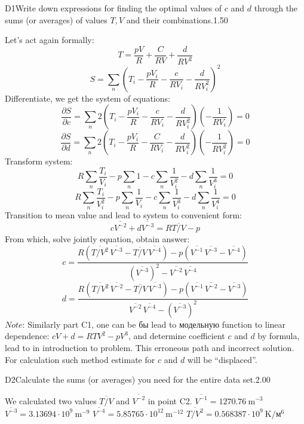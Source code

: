 \documentclass[11pt,a4paper]{article}
\begin{document}
\begin{solcard}{D1}{Write down expressions for finding the optimal values of $c$ and $d$ through the sums (or averages) of values $T, V$ and their combinations.}{1.50}

Let's act again formally: $$T=\frac{p V}{R}+\frac{C}{R V}+\frac{d}{R V^{2}}$$ $$S=\sum_{n}\left(T_{i}-\frac{p V_{i}}{R}-\frac{c}{R V_{i}}-\frac{d}{R V_{i}^{2}}\right)^{2}$$ Differentiate, we get the system of equations: $$\frac{\partial S}{\partial c}=\sum_{n} 2\left(T_{i}-\frac{p V_{i}}{R}-\frac{c}{R V_{i}}-\frac{d}{R V_{i}^{2}}\right)\left(-\frac{1}{R V_{i}}\right)=0$$ $$\frac{\partial S}{\partial d}=\sum_{n} 2\left(T_{i}-\frac{p V_{i}}{R}-\frac{C}{R V_{i}}-\frac{d}{R V_{i}^{2}}\right)\left(-\frac{1}{R V_{i}^{2}}\right)=0$$ Transform system: $$R \sum_{n} \frac{T_{i}}{V_{i}}-p \sum_{n} 1-c \sum_{n} \frac{1}{V_{i}^{2}}-d \sum_{n} \frac{1}{V_{i}^{3}}=0$$ $$R \sum_{n} \frac{T_{i}}{V_{i}^{2}}-p \sum_{n} \frac{1}{V_{i}}-c \sum_{n} \frac{1}{V_{i}^{3}}-d \sum_{n} \frac{1}{V_{i}^{4}}=0$$ Transition to mean value and lead to system to convenient form: $$c \overline{V^{-2}}+d \overline{V^{-3}}=R \overline{T / V}-p$$ $$ $$ From which, solve jointly equation, obtain answer: $$c=\frac{R\left(\overline{T / V^{2}}\,\overline{V^{-3}}-\overline{T / V}\,\overline{V^{-4}}\right)-p\left(\overline{V^{-1}}\,\overline{V^{-3}}-\overline{V^{-4}}\right)}{\left(\overline{V^{-3}}\right)^{2}-\overline{V^{-2}}\,\overline{V^{-4}}}$$ $$d=\frac{R\left(\overline{T / V^{2}}\,\overline{V^{-2}}-\overline{T / V}\,\overline{V^{-3}}\right)-p\left(\overline{V^{-1}}\,\overline{V^{-2}}-\overline{V^{-3}}\right)}{\overline{V^{-2}}\,\overline{V^{-4}}-\left(\overline{V^{-3}}\right)^{2}}$$ $\textit{Note:}$ Similarly part C1, one can be бы lead to модельную function to linear dependence: $c V+d=R T V^{2}-p V^{3}$, and determine coefficient $c$ and $d$ by formula, lead to in introduction to problem. This erroneous path and incorrect solution. For calculation such method estimate for $c$ and $d$ will be “displaced”.

\end{solcard}

\begin{solcard}{D2}{Calculate the sums (or averages) you need for the entire data set.}{2.00}

We calculated two values $\overline{T / V}$ and $\overline{V^{-2}}$ in point C2. $\overline{V^{-1}}=1270.76~\mathrm{m}^{-3}$ $\overline{V^{-3}}=3.13694\cdot 10^9~\mathrm{m}^{-9}$ $\overline{V^{-4}}=5.85765\cdot 10^{12}~\mathrm{m}^{-12}$ $\overline{T / V^2}=0.568387\cdot 10^9~\mathrm{K}/м^6$

\end{solcard}
\end{document}
